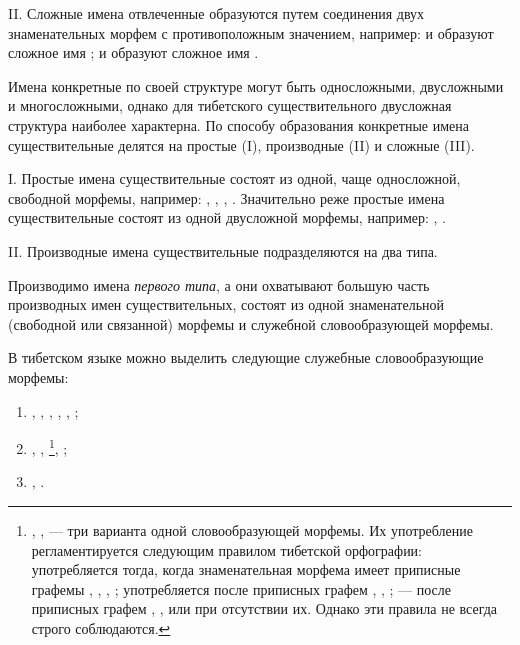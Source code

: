 II. Сложные имена отвлеченные образуются путем соединения двух знаменательных морфем с противоположным значением, например:  и  образуют сложное имя ;  и  образуют сложное имя .

Имена конкретные по своей структуре могут быть односложными, двусложными и многосложными, однако для тибетского существительного двусложная структура наиболее характерна. По способу образования конкретные имена существительные делятся на простые (I), производные (II) и сложные (III).

I. Простые имена существительные состоят из одной, чаще односложной, свободной морфемы, например: , , , . Значительно реже простые имена существительные состоят из одной двусложной морфемы, например: , .

II. Производные имена существительные подразделяются на два типа.

Производимо имена \emph{первого типа}, а они охватывают большую часть производных имен существительных, состоят из одной знаменательной (свободной или связанной) морфемы и служебной словообразующей морфемы.

В тибетском языке можно выделить следующие служебные словообразующие морфемы:

\begin{enumerate}
    \item {}, , , , , ;
    \item {}, , 
    \footnote[25]{, ,  --- три варианта одной словообразующей морфемы. Их употребление регламентируется следующим правилом тибетской орфографии:  употребляется тогда, когда знаменательная морфема имеет приписные графемы , , , ;  употребляется после приписных графем , , ;  --- после приписных графем , ,  или при отсутствии их. Однако эти правила не всегда строго соблюдаются.},
    ;
    \item {}, .
\end{enumerate}

